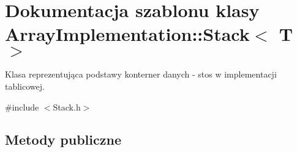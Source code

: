\hypertarget{class_array_implementation_1_1_stack}{\section{Dokumentacja szablonu klasy Array\-Implementation\-:\-:Stack$<$ T $>$}
\label{class_array_implementation_1_1_stack}
}


Klasa reprezentująca podstawy konterner danych -\/ stos w implementacji tablicowej.  




{\ttfamily \#include $<$Stack.\-h$>$}

\subsection*{Metody publiczne}
